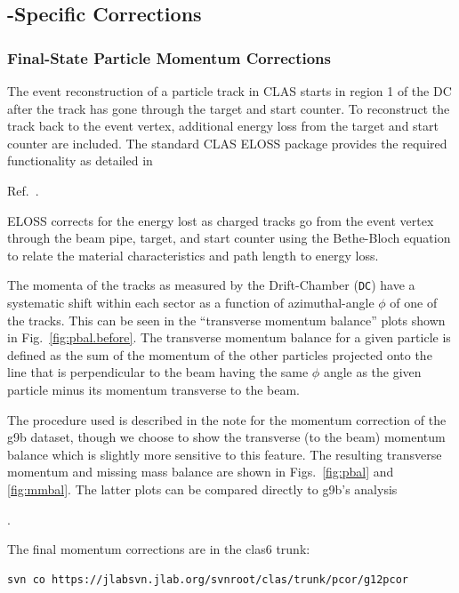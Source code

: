 \subsection{\label{sec:corrections}-Specific Corrections}

\subsubsection{\label{sec:corrections.pcor}Final-State Particle Momentum Corrections}

The event reconstruction of a particle track in CLAS starts in region 1 of the DC after the track has gone through the target and start counter. To reconstruct the track back to the event vertex, additional energy loss from the target and start counter are included. The standard CLAS ELOSS package provides the required functionality as detailed in \begin{v2}Ref.~\cite{clas.note.eloss}.\end{v2} ELOSS corrects for the energy lost as charged tracks go from the event vertex through the beam pipe, target, and start counter using the Bethe-Bloch equation \cite{pdg} to relate the material characteristics and path length to energy loss.

The momenta of the tracks as measured by the Drift-Chamber (\texttt{DC}) have a systematic shift within each sector as a function of azimuthal-angle $\phi$ of one of the tracks. This can be seen in the ``transverse momentum balance'' plots shown in Fig.~\ref{fig:pbal.before}. The transverse momentum balance for a given particle is defined as the sum of the momentum of the other particles projected onto the line that is perpendicular to the beam having the same $\phi$ angle as the given particle minus its momentum transverse to the beam.

The procedure used is described in the  note for the momentum correction of the g9b dataset\cite{clas.note.g9bpcor}, though we choose to show the transverse (to the beam) momentum balance which is slightly more sensitive to this feature. The resulting transverse momentum and missing mass balance are shown in Figs.~\ref{fig:pbal} and \ref{fig:mmbal}. The latter plots can be compared directly to g9b's analysis\begin{v2}\cite{clas.note.g9bpcor}.\end{v2}

The final  momentum corrections are in the clas6 trunk:
\begin{verbatim}
svn co https://jlabsvn.jlab.org/svnroot/clas/trunk/pcor/g12pcor
\end{verbatim}


